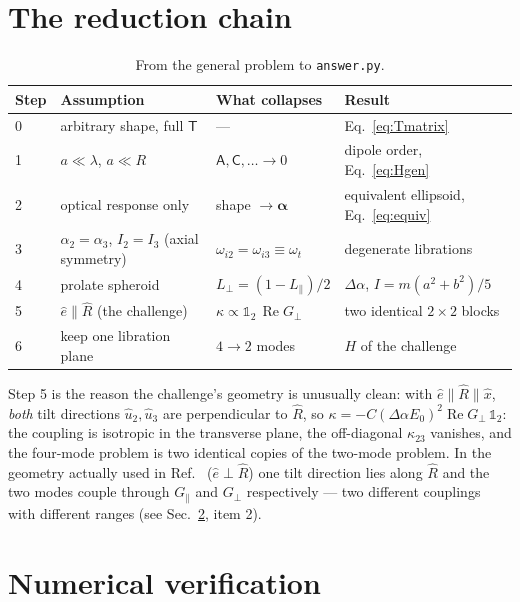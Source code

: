 \documentclass[11pt,a4paper]{article}
\newcommand{\dalpha}{\Delta\alpha}
\newcommand{\bal}{\boldsymbol{\alpha}}
\begin{document}
\section{The reduction chain}

\begin{table}[h]
\centering\small
\begin{tabular}{llll}
\toprule
Step & Assumption & What collapses & Result \\
\midrule
0 & arbitrary shape, full $\mathsf T$
  & --- & Eq.~\eqref{eq:Tmatrix} \\
1 & $a\ll\lambda$, $a\ll R$
  & $\mathsf A,\mathsf C,\dots\to0$ & dipole order, Eq.~\eqref{eq:Hgen} \\
2 & optical response only
  & shape $\to\bal$ & equivalent ellipsoid, Eq.~\eqref{eq:equiv} \\
3 & $\alpha_2=\alpha_3$, $I_2=I_3$ (axial symmetry)
  & $\omega_{i2}=\omega_{i3}\equiv\omega_t$ & degenerate librations \\
4 & prolate spheroid
  & $L_{\perp}=(1-L_{\parallel})/2$ & $\dalpha$, $I=m(a^{2}+b^{2})/5$ \\
5 & $\hat e\parallel\hat R$ (the challenge)
  & $\kappa\propto\mathbb 1_{2}\,\operatorname{Re}G_{\perp}$
  & two identical $2\times2$ blocks \\
6 & keep one libration plane
  & $4\to2$ modes & $H$ of the challenge \\
\bottomrule
\end{tabular}
\caption{From the general problem to \texttt{answer.py}.}
\label{tab:chain}
\end{table}

\noindent
Step 5 is the reason the challenge's geometry is unusually clean: with
$\hat e\parallel\hat R\parallel\hat x$, \emph{both} tilt directions
$\hat u_2,\hat u_3$ are perpendicular to $\hat R$, so
$\kappa=-C(\dalpha E_0)^{2}\operatorname{Re}G_{\perp}\,\mathbb 1_{2}$: the coupling
is isotropic in the transverse plane, the off-diagonal $\kappa_{23}$ vanishes,
and the four-mode problem is two identical copies of the two-mode problem.  In
the geometry actually used in Ref.~\cite{Zhang2025} ($\hat e\perp\hat R$) one
tilt direction lies along $\hat R$ and the two modes couple through
$G_{\parallel}$ and $G_{\perp}$ respectively --- two different couplings with
different ranges (see Sec.~\ref{sec:verify}, item 2).

\section{Numerical verification}
\label{sec:verify}
\end{document}

